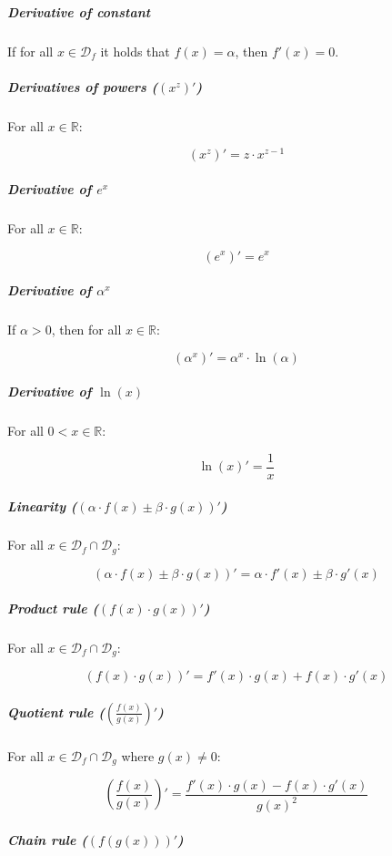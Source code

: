 \documentclass[titlepage]{article}
\begin{document}
            \subparagraph{Derivative of constant}

              If for all $x \in \mathcal{D}_f$ it holds that $f(x) = \alpha$,
              then $f'(x) = 0$.

            \subparagraph{Derivatives of powers ($\left( x^z \right)'$)}

              For all $x \in \mathbb{R}$:

              $$\left( x^z \right)' =z \cdot x^{z - 1}$$

            \subparagraph{Derivative of $e^x$}

              For all $x \in \mathbb{R}$:

              $$\left( e^x \right)' = e^x$$

            \subparagraph{Derivative of $\alpha^x$}

              If $\alpha > 0$, then for all $x \in \mathbb{R}$:

              $$\left( \alpha^x \right)' = \alpha^x \cdot \ln(\alpha)$$

            \subparagraph{Derivative of $\ln(x)$}

              For all $0 < x \in \mathbb{R}$:

              $$\ln(x)' = \frac{1}{x}$$

            \subparagraph{%
              Linearity ($(\alpha \cdot f(x) \pm \beta \cdot g(x))'$)
            }

              For all $x \in \mathcal{D}_f \cap \mathcal{D}_g$:

              $$
                (\alpha \cdot f(x) \pm \beta \cdot g(x))'
                  = \alpha \cdot f'(x) \pm \beta \cdot g'(x)
              $$

            \subparagraph{Product rule ($(f(x) \cdot g(x))'$)}

              For all $x \in \mathcal{D}_f \cap \mathcal{D}_g$:

              $$(f(x) \cdot g(x))' = f'(x) \cdot g(x) + f(x) \cdot g'(x)$$

            \subparagraph{Quotient rule ($\left( \frac{f(x)}{g(x)} \right)'$)}

              For all $x \in \mathcal{D}_f \cap \mathcal{D}_g$ where
              $g(x) \neq 0$:

              $$
                \left( \frac{f(x)}{g(x)} \right)'
                  = \frac{f'(x) \cdot g(x) - f(x) \cdot g'(x)}{g(x)^2}
              $$

            \subparagraph{Chain rule ($(f(g(x)))'$)}
\end{document}
